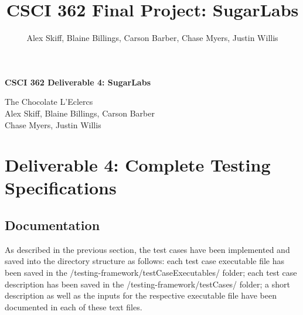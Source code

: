 \documentclass{article}
\title{CSCI 362 Final Project: SugarLabs}
\author{Alex Skiff, Blaine Billings, Carson Barber, Chase Myers, Justin Willis}
\date{ }
\begin{document}
\begin{center}
\textbf{CSCI 362 Deliverable 4: SugarLabs}
\end{center}


\begin{center}

{The Chocolate L'Eclercs}\\
\vspace{0.2cm}
{Alex Skiff, Blaine Billings, Carson Barber}\\
{Chase Myers, Justin Willis}\\
\vspace{0.2cm}

\end{center}

\section{Deliverable 4: Complete Testing Specifications}
\subsection{Documentation}
As described in the previous section, the test cases have been implemented and saved into the directory structure as follows: each test case executable file has been saved in the /testing-framework/testCaseExecutables/ folder; each test case description has been saved in the /testing-framework/testCases/ folder; a short description as well as the inputs for the respective executable file have been documented in each of these text files.
\end{document}
